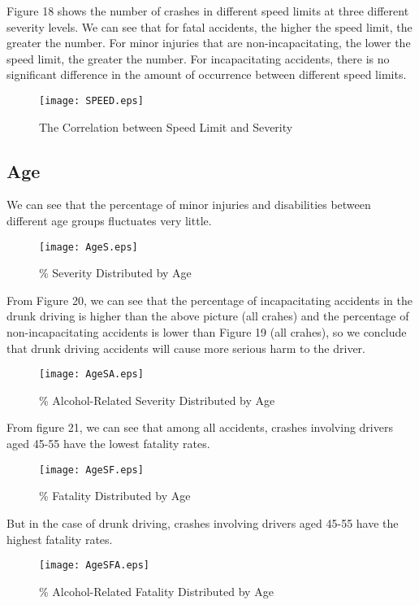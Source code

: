 \documentclass[10pt]{article}
\begin{document}
Figure 18 shows the number of crashes in different speed limits at three different severity levels. We can see that for fatal accidents, the higher the speed limit, the greater the number. For minor injuries that are non-incapacitating, the lower the speed limit, the greater the number. For incapacitating accidents, there is no significant difference in the amount of occurrence between different speed limits.

\begin{figure}[H]
\flushleft
\texttt{[image: SPEED.eps]}
\caption{The Correlation between Speed Limit and Severity}
\label{18}
\end{figure}

\newpage
\subsection{Age}

We can see that the percentage of minor injuries and disabilities between different age groups fluctuates very little.

\begin{figure}[H]
\flushleft
\texttt{[image: AgeS.eps]}
\caption{\% Severity Distributed by Age}
\label{19}
\end{figure}

\newpage

From Figure 20, we can see that the percentage of incapacitating accidents in the drunk driving is higher than the above picture (all crahes) and the percentage of non-incapacitating accidents is lower than Figure 19 (all crahes), so we conclude that drunk driving accidents will cause more serious harm to the driver.

\begin{figure}[H]
\flushleft
\texttt{[image: AgeSA.eps]}
\caption{\% Alcohol-Related Severity Distributed by Age}
\label{20}
\end{figure}

\newpage
From figure 21, we can see that among all accidents, crashes involving drivers aged 45-55 have the lowest fatality rates.

\begin{figure}[H]
\flushleft
\texttt{[image: AgeSF.eps]}
\caption{\% Fatality Distributed by Age}
\label{21}
\end{figure}

\newpage
But in the case of drunk driving, crashes involving drivers aged 45-55 have the highest fatality rates.

\begin{figure}[H]
\flushleft
\texttt{[image: AgeSFA.eps]}
\caption{\% Alcohol-Related Fatality Distributed by Age}
\label{22}
\end{figure}
\end{document}
